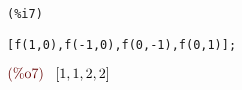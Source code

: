 \documentclass{article}
\begin{document}
\noindent
\begin{minipage}[t]{8ex}{\color{red}\bf
\begin{verbatim}
(%i7) 
\end{verbatim}}
\end{minipage}
\begin{minipage}[t]{\textwidth}{\color{blue}
\begin{verbatim}
[f(1,0),f(-1,0),f(0,-1),f(0,1)];
\end{verbatim}}
\end{minipage}
\begin{math}\displaystyle
\parbox{8ex}{\color{labelcolor}(\%o7) }
[1,1,2,2]
\end{math}
\end{document}
